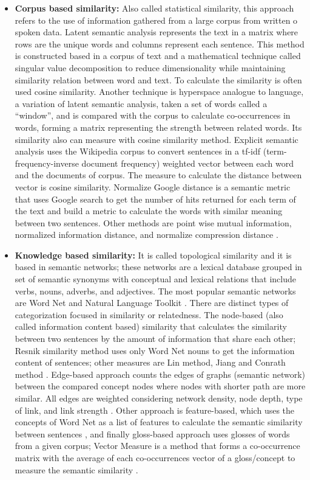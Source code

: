 \documentclass[12pt]{report}
\begin{document}
\begin{itemize}[nolistsep]
	\item \textbf{Corpus based similarity:} 
	Also called statistical similarity, this approach refers to the use  of information gathered from a large corpus from written o spoken data. Latent semantic analysis represents the text in a matrix where rows are the unique words and columns represent each sentence. This method is constructed based in a corpus of text and a mathematical technique called singular value decomposition to reduce dimensionality while maintaining similarity relation between word and text. To calculate the similarity is often used cosine similarity.  Another technique is hyperspace analogue to language, a variation of latent semantic analysis, taken a set of words called a ``window'', and is compared with the corpus to calculate co-occurrences in words, forming a matrix representing the strength between related words. Its similarity also can measure with cosine similarity method. Explicit semantic analysis uses the Wikipedia corpus to convert sentences in a tf-idf (term-frequency-inverse document frequency) weighted vector between each word and the documents of corpus. The measure to calculate the distance between vector is cosine similarity. Normalize Google distance is a semantic metric that uses Google search to get the number of hits returned for each term of the text and build a metric to calculate the words with similar meaning between two sentences. Other methods are point wise mutual information, normalized information distance, and normalize compression distance  \cite{Ganesan2015,Majumder2016,Gomaa2013,Zhang2015}.
	
	\item \textbf{Knowledge based similarity:} It is called topological similarity and it is based in semantic networks; these networks are a lexical database grouped in set of semantic synonyms with conceptual and lexical relations that include verbs, nouns, adverbs, and adjectives. The most popular semantic networks are Word Net and Natural Language Toolkit \cite{Pradhan2015,Majumder2016,Gomaa2013}. There are distinct types of categorization focused in similarity or relatedness. The node-based (also called information content based) similarity that calculates the similarity between two sentences by the amount of information that share each other; Resnik similarity method uses only Word Net nouns to get the information content of sentences; other measures are Lin method, Jiang and Conrath method \cite{Pradhan2015,Majumder2016,Zhang2015}. Edge-based approach counts the edges of graphs (semantic network) between the compared concept nodes where nodes with shorter path are more similar. All edges are weighted considering network density, node depth, type of link, and link strength \cite{Majumder2016,Zhang2015}. Other approach is feature-based, which uses the concepts of Word Net as a list of features to calculate the semantic similarity between sentences \cite{Zhang2015}, and finally gloss-based approach uses glosses of words from a given corpus; Vector Measure is a method that forms a co-occurrence matrix with the average of each co-occurrences vector of a gloss/concept to measure the semantic similarity \cite{Pradhan2015,Zhang2015}.
	

\end{itemize}
\end{document}
